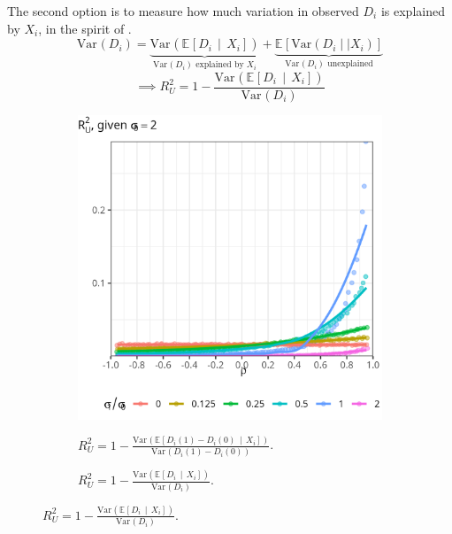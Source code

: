 \documentclass[a4paper, 12pt]{article}                                     %
\renewcommand{\vec}[1]{\boldsymbol{\mathit{#1}}}                           %
\newcommand{\E}[2][]{\mathbb{E}_{#1} \left[ #2 \right]}                    %
\newcommand{\Egiven}[3][]{\mathbb{E}_{#1} \left[ #2 \, \middle\vert \, #3 \right]} %
\newcommand{\Var}[2][]{\text{Var}_{#1} \left( #2 \right)}                  %
\begin{document}
The second option is to measure how much variation in observed $D_i$ is explained by $\vec X_i$, in the spirit of \cite{altonji2005selection}.
\[ \Var{D_i} =
    \underbrace{
        \Var{\Egiven{D_i}{X_i}}}_{
            \Var{D_i}\text{ explained by }\vec X_i}
    + \underbrace{
        \E{\text{Var} \left( D_i \mid| \vec X_i \right)}}_{
            \Var{D_i}\text{ unexplained}} \]
\[ \implies R^2_U =
    1 - \frac{
        \Var{\Egiven{D_i}{X_i}}}{
            \Var{D_i}} \]
\begin{figure}[H]
    \centering
    \singlespacing
    \caption{Simulated $R^2_U$ Values.}
    \begin{subfigure}[b]{0.495\textwidth}
        \centering
        \caption{$R^2_U =
        1 - \frac{
            \Var{\Egiven{D_i(1) - D_i(0)}{X_i}}}{
                \Var{D_i(1) - D_i(0)}}$.}
        \includegraphics[width=\textwidth]{sim-output/R2Uvar-D1D0.png}
        \label{fig:R2Uvar-D1D0}
    \end{subfigure}
    \begin{subfigure}[b]{0.495\textwidth}
        \centering
        \caption{$R^2_U =
        1 - \frac{
            \Var{\Egiven{D_i}{X_i}}}{
                \Var{D_i}} $.}

\end{subfigure}
\end{figure}
\end{document}
